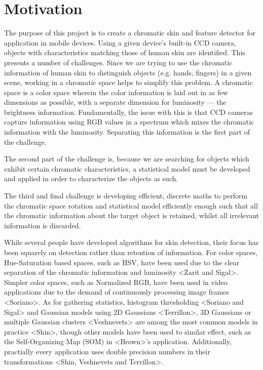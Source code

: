 
\chapter{Motivation}  %

\ifpdf
    \graphicspath{{Chapter1/Figs/Raster/}{Chapter2/Figs/PDF/}{Chapter2/Figs/}}
\else
    \graphicspath{{Chapter1/Figs/Vector/}{Chapter2/Figs/}}
\fi

The purpose of this project is to create a chromatic skin and feature detector for application in mobile devices. Using a given device's built-in CCD camera, objects with characteristics matching those of human skin are identified. This presents a number of challenges. Since we are trying to use the chromatic information of human skin to distinguish objects (e.g. hands, fingers) in a given scene, working in a chromatic space helps to simplify this problem. A chromatic space is a color space wherein the color information is laid out in as few dimensions as possible, with a separate dimension for luminosity --- the brightness information. Fundamentally, the issue with this is that CCD cameras capture information using RGB values in a spectrum which mixes the chromatic information with the luminosity. Separating this information is the first part of the challenge.

The second part of the challenge is, because we are searching for objects which exhibit certain chromatic characteristics, a statistical model must be developed and applied in order to characterize the objects as such.

The third and final challenge is developing efficient, discrete maths to perform the chromatic space rotation and statistical model efficiently enough such that all the chromatic information about the target object is retained, whilst all irrelevant information is discarded.

While several people have developed algorithms for skin detection, their focus has been squarely on detection rather than retention of information. For color spaces, Hue-Saturation based spaces, such as HSV, have been used due to the clear separation of the chromatic information and luminosity <Zarit and Sigal>. Simpler color spaces, such as Normalized RGB, have been used in video applications due to the demand of continuously processing image frames <Soriano>. As for gathering statistics, histogram thresholding <Soriano and Sigal> and Gaussian models using 2D Gaussians <Terrillon>, 3D Gaussians or multiple Gaussian clusters <Veshnevets> are among the most common models in practice <Shin>, though other models have been used to similar effect, such as the Self-Organizing Map (SOM) in <Brown>'s application. Additionally, practially every application uses double precision numbers in their transformations <Shin, Veshnevets and Terrillon>.


